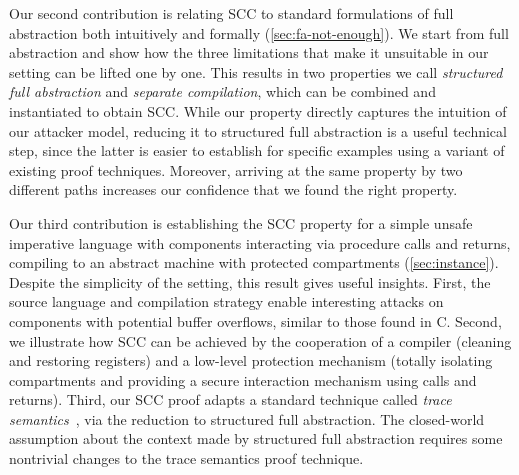 \documentclass[10pt, conference, compsocconf, letterpaper, times]{IEEEtran}
\begin{document}
Our second contribution is relating SCC
to standard formulations of full abstraction both intuitively and formally
(\autoref{sec:fa-not-enough}).
We start from full abstraction and show how the three
limitations that make it unsuitable in our setting can be lifted
one by one.
This results in two properties we call {\em structured full abstraction} and
{\em separate compilation}, which can be combined and instantiated to obtain
SCC.
\ifsooner
{}
\fi
While our property directly captures the intuition of our
attacker model, reducing it to structured full abstraction is a useful
technical step, since the latter is easier to establish for specific
examples using a variant of existing proof techniques.
Moreover, arriving at the same property by two different paths
increases our confidence that we found the right property.

\ifsooner
{}
\fi

Our third contribution is establishing the SCC property for a simple
unsafe imperative language with components interacting via procedure
calls and returns, compiling to an abstract machine with protected
compartments (\autoref{sec:instance}).
Despite the simplicity of the setting, this result gives useful
insights.  
First, the source language and compilation strategy enable interesting
attacks on components with potential buffer overflows, similar to those
found in C.
Second, we illustrate how SCC can be
achieved by the cooperation of a compiler (cleaning and restoring
registers) and a low-level protection mechanism (totally isolating
compartments and providing a secure interaction mechanism using calls
and returns).
Third, our SCC proof adapts a standard technique called {\em trace
  semantics}~\cite{JeffreyR05, PatrignaniC15}, via the reduction to
structured full abstraction.
The closed-world assumption about the context made by structured full
abstraction requires some nontrivial changes to the trace
semantics proof technique.
\end{document}
